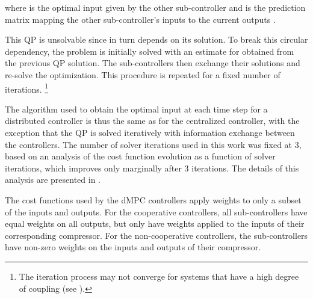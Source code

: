 \noindent where  is the optimal input given by the other sub-controller and  is the prediction matrix mapping the other sub-controller's inputs to the current outputs .

This QP is unsolvable since  in turn depends on its solution.
To break this circular dependency, the problem is initially solved with an estimate for  obtained from the previous QP solution.
The sub-controllers then exchange their solutions and re-solve the optimization.
This procedure is repeated for a fixed number of iterations.%
\footnote{The iteration process may not converge for systems that have a high degree of coupling (see \cite{Stewart2010}).}

The algorithm used to obtain the optimal input at each time step for a distributed controller is thus the same as for the centralized controller, with the exception that the QP is solved iteratively with information exchange between the controllers.
The number of solver iterations used in this work was fixed at 3, based on an analysis of the cost function evolution as a function of solver iterations, which improves only marginally after 3 iterations.
The details of this analysis are presented in \cite{Jones2016}.

The cost functions used by the dMPC controllers apply weights to only a subset of the inputs and outputs.
For the cooperative controllers, all sub-controllers have equal weights on all outputs, but only have weights applied to the inputs of their corresponding compressor.
For the non-cooperative controllers, the sub-controllers have non-zero weights on the inputs and outputs of their compressor.

